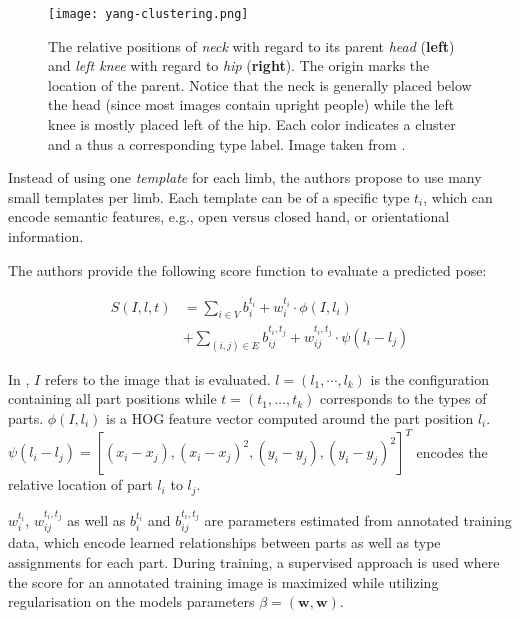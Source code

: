 \begin{figure}[htb!]
    \centering
    \texttt{[image: yang-clustering.png]}
    \caption{The relative positions of \textit{neck} with regard to     its parent \textit{head} (\textbf{left}) and \textit{left knee} with regard to \textit{hip} (\textbf{right}). The origin marks the location of the parent. Notice that the neck is generally placed below the head (since most images contain upright people) while the left knee is mostly placed left of the hip. Each color indicates a cluster and a thus a corresponding type label. Image taken from \cite{yang_articulated_2011}.}
    \label{fig:yang-clustering}
\end{figure}

Instead of using one \textit{template} for each limb, the authors propose to use many small templates per limb.
Each template can be of a specific type $t_i$, which can encode semantic features, e.g., open versus closed hand, or orientational information.

The authors provide the following score function to evaluate a predicted pose:

\begin{equation}
    \label{eq:yang-score}
    \begin{split}
        S(I, l, t) 
        &= \sum_{i \in V} b_i^{t_i} + w_i^{t_i} \cdot \phi(I, l_i) \\
        &+ \sum_{(i,j) \in E} b_{ij}^{t_i, t_j} + w_{ij}^{t_i, t_j} \cdot \psi(l_i - l_j)
    \end{split}
\end{equation}

In , $I$ refers to the image that is evaluated.
$l = (l_1, \cdots, l_k)$ is the configuration containing all part positions while $t = (t_1, \dots, t_k)$ corresponds to the types of parts.
$\phi(I, l_i)$ is a HOG feature vector \cite{dalal_histograms_2005} computed around the part position $l_i$.
$\psi(l_i - l_j) = [(x_i - x_j), (x_i - x_j)^2, (y_i - y_j), (y_i - y_j)^2]^T$ encodes the relative location of part $l_i$ to $l_j$.

$w_i^{t_i}$, $w_{ij}^{t_i, t_j}$ as well as $b_i^{t_i}$ and $b_{ij}^{t_i, t_j}$ are parameters estimated from annotated training data, which encode learned relationships between parts as well as type assignments for each part.
During training, a supervised approach is used where the score for an annotated training image is maximized while utilizing regularisation on the models parameters $\beta = (\bm{w}, \bm{w})$.

